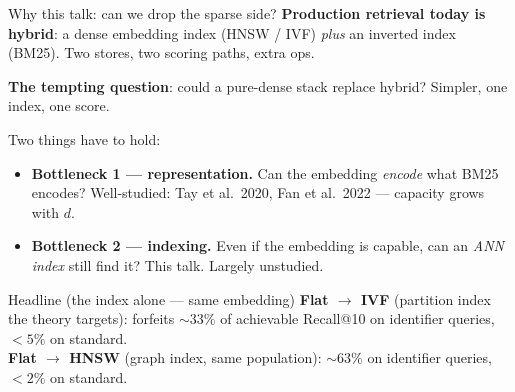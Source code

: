 
\begin{frame}[plain]
  \titlepage
\end{frame}

\begin{frame}{Why this talk: can we drop the sparse side?}
  \textbf{Production retrieval today is \alert{hybrid}}: a dense embedding index
  (HNSW / IVF) \emph{plus} an inverted index (BM25). Two stores, two scoring
  paths, extra ops.

  \medskip
  \textbf{The tempting question}: could a pure-dense stack replace hybrid?
  Simpler, one index, one score.

  \medskip
  Two things have to hold:
  \begin{itemize}
    \item \textbf{Bottleneck 1 --- representation.}
          Can the embedding \emph{encode} what BM25 encodes?
          Well-studied: Tay et al.\ 2020, Fan et al.\ 2022 --- capacity grows with $d$.
    \item \textbf{Bottleneck 2 --- indexing.}
          Even if the embedding is capable, can an \emph{ANN index} still find it?
          \alert{This talk. Largely unstudied.}
  \end{itemize}

  \vspace{0.5em}
  \begin{block}{Headline (the index alone --- same embedding)}
    \textbf{Flat $\to$ IVF} (partition index the theory targets):\;
    forfeits \alert{$\sim 33\%$} of achievable Recall@10 on identifier queries,
    $<5\%$ on standard.\\[0.2em]
    \textbf{Flat $\to$ HNSW} (graph index, same population):
    \alert{$\sim 63\%$} on identifier queries, $<2\%$ on standard.
  \end{block}
\end{frame}

